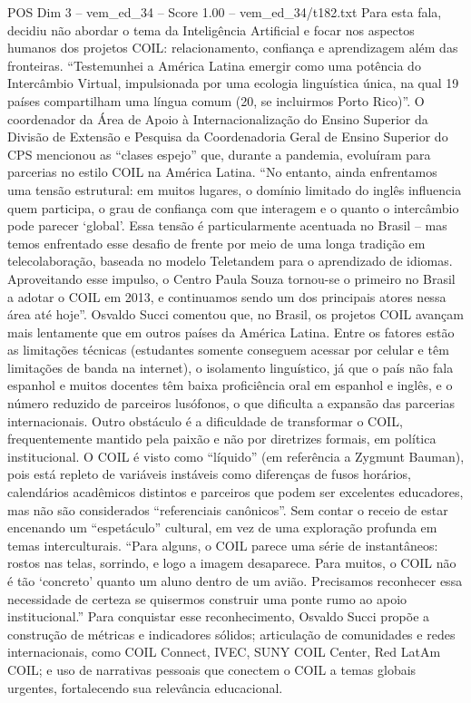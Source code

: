 \begin{textsample}{POS Dim 3 – vem\_ed\_34 – Score 1.00 – vem\_ed\_34/t182.txt}
Para esta fala, decidiu não abordar o tema da Inteligência Artificial e focar nos aspectos humanos dos projetos COIL: relacionamento, confiança e aprendizagem além das fronteiras. “Testemunhei a América Latina emergir como uma potência do Intercâmbio Virtual, impulsionada por uma ecologia linguística única, na qual 19 países compartilham uma língua comum (20, se incluirmos Porto Rico)”.
O coordenador da Área de Apoio à Internacionalização do Ensino Superior da Divisão de Extensão e Pesquisa da Coordenadoria Geral de Ensino Superior do CPS mencionou as “clases espejo” que, durante a pandemia, evoluíram para parcerias no estilo COIL na América Latina. “No entanto, ainda enfrentamos uma tensão estrutural: em muitos lugares, o domínio limitado do inglês influencia quem participa, o grau de confiança com que interagem e o quanto o intercâmbio pode parecer ‘global’.
Essa tensão é particularmente acentuada no Brasil – mas temos enfrentado esse desafio de frente por meio de uma longa tradição em telecolaboração, baseada no modelo Teletandem para o aprendizado de idiomas.
Aproveitando esse impulso, o Centro Paula Souza tornou-se o primeiro no Brasil a adotar o COIL em 2013, e continuamos sendo um dos principais atores nessa área até hoje”.
Osvaldo Succi comentou que, no Brasil, os projetos COIL avançam mais lentamente que em outros países da América Latina.
Entre os fatores estão as limitações técnicas (estudantes somente conseguem acessar por celular e têm limitações de banda na internet), o isolamento linguístico, já que o país não fala espanhol e muitos docentes têm baixa proficiência oral em espanhol e inglês, e o número reduzido de parceiros lusófonos, o que dificulta a expansão das parcerias internacionais.
Outro obstáculo é a dificuldade de transformar o COIL, frequentemente mantido pela paixão e não por diretrizes formais, em política institucional.
O COIL é visto como “líquido” (em referência a Zygmunt Bauman), pois está repleto de variáveis instáveis como diferenças de fusos horários, calendários acadêmicos distintos e parceiros que podem ser excelentes educadores, mas não são considerados “referenciais canônicos”.
Sem contar o receio de estar encenando um “espetáculo” cultural, em vez de uma exploração profunda em temas interculturais. “Para alguns, o COIL parece uma série de instantâneos: rostos nas telas, sorrindo, e logo a imagem desaparece.
Para muitos, o COIL não é tão ‘concreto’ quanto um aluno dentro de um avião.
Precisamos reconhecer essa necessidade de certeza se quisermos construir uma ponte rumo ao apoio institucional.” Para conquistar esse reconhecimento, Osvaldo Succi propõe a construção de métricas e indicadores sólidos; articulação de comunidades e redes internacionais, como COIL Connect, IVEC, SUNY COIL Center, Red LatAm COIL; e uso de narrativas pessoais que conectem o COIL a temas globais urgentes, fortalecendo sua relevância educacional.

\end{textsample}

